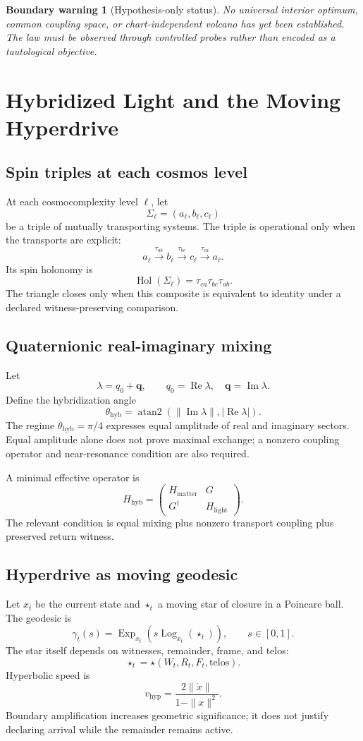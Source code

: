 \documentclass[12pt,openany]{book}
\newtheorem{warning}[definition]{Boundary warning}
\theoremstyle{remark}
\DeclareMathOperator{\Hol}{Hol}
\begin{document}
\begin{warning}[Hypothesis-only status]
No universal interior optimum, common coupling space, or chart-independent volcano has yet been established. The law must be observed through controlled probes rather than encoded as a tautological objective.
\end{warning}

\chapter{Hybridized Light and the Moving Hyperdrive}
\label{ch:hybrid-light}

\section{Spin triples at each cosmos level}
At each cosmocomplexity level $\ell$, let
\[
\Sigma_\ell=(a_\ell,b_\ell,c_\ell)
\]
be a triple of mutually transporting systems. The triple is operational only when the transports are explicit:
\[
a_\ell\xrightarrow{\tau_{ab}}b_\ell
\xrightarrow{\tau_{bc}}c_\ell
\xrightarrow{\tau_{ca}}a_\ell.
\]
Its spin holonomy is
\[
\Hol(\Sigma_\ell)
=\tau_{ca}\tau_{bc}\tau_{ab}.
\]
The triangle closes only when this composite is equivalent to identity under a declared witness-preserving comparison.

\section{Quaternionic real-imaginary mixing}
Let
\[
\lambda=q_0+\mathbf q,
\qquad
q_0=\operatorname{Re}\lambda,
\quad
\mathbf q=\operatorname{Im}\lambda.
\]
Define the hybridization angle
\[
\theta_{\mathrm{hyb}}
=\operatorname{atan2}
\left(\|\operatorname{Im}\lambda\|,
|\operatorname{Re}\lambda|\right).
\]
The regime $\theta_{\mathrm{hyb}}=\pi/4$ expresses equal amplitude of real and imaginary sectors. Equal amplitude alone does not prove maximal exchange; a nonzero coupling operator and near-resonance condition are also required.

A minimal effective operator is
\[
H_{\mathrm{hyb}}
=
\begin{pmatrix}
H_{\mathrm{matter}} & G\\
G^\dagger & H_{\mathrm{light}}
\end{pmatrix}.
\]
The relevant condition is equal mixing plus nonzero transport coupling plus preserved return witness.

\section{Hyperdrive as moving geodesic}
Let $x_t$ be the current state and $\star_t$ a moving star of closure in a Poincare ball. The geodesic is
\[
\gamma_t(s)
=\operatorname{Exp}_{x_t}
\left(s\operatorname{Log}_{x_t}(\star_t)\right),
\qquad s\in[0,1].
\]
The star itself depends on witnesses, remainder, frame, and telos:
\[
\star_t=\star(W_t,R_t,F_t,\text{telos}).
\]
Hyperbolic speed is
\[
v_{\mathrm{hyp}}
=\frac{2\|\dot x\|}{1-\|x\|^2}.
\]
Boundary amplification increases geometric significance; it does not justify declaring arrival while the remainder remains active.
\end{document}

